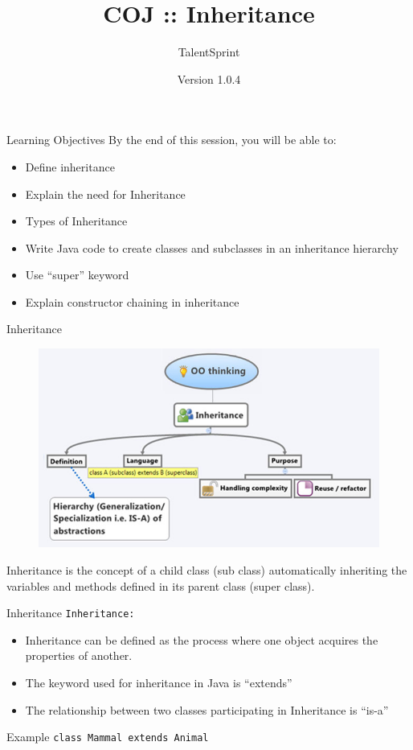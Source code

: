 \documentclass[14pt]{beamer}
\title[COJ:Java:03]{COJ :: Inheritance }
\author[TS]{TalentSprint}
\institute[L\&D]{Licensed To Skill}
\date{Version 1.0.4}
\begin{document}
\begin{frame}
  \titlepage
\end{frame}

\begin{frame}{Learning Objectives}
By the end of this session, you will be able to:
  \begin{itemize}
  \item Define inheritance
  \item Explain the need for Inheritance
  \item Types of Inheritance
  \item Write Java code to create classes and subclasses in an inheritance hierarchy
  \item Use ``super'' keyword
  \item Explain constructor chaining in inheritance 
 

  \end{itemize}
\end{frame}

\begin{frame}{Inheritance}
 \begin{figure}[H]
 \begin{center}
   \includegraphics[scale=.3]{inheritance-oothinking.png}
 \end{center}
 \end{figure}
 Inheritance is the concept of a child class (sub class) automatically inheriting the variables and methods defined in its parent class (super class). 
 
\end{frame}

\begin{frame}{Inheritance}
 \texttt{Inheritance:}
 \begin{itemize}
  \item Inheritance can be defined as the process where one object acquires the properties of another. 
  \item The keyword used for inheritance in Java is ``extends''
  \item The relationship between two classes participating in Inheritance is ``is-a''
 \end{itemize}
\begin{block}{Example}
 \lstinline!class Mammal extends Animal!
\end{block}

\end{frame}
\end{document}
